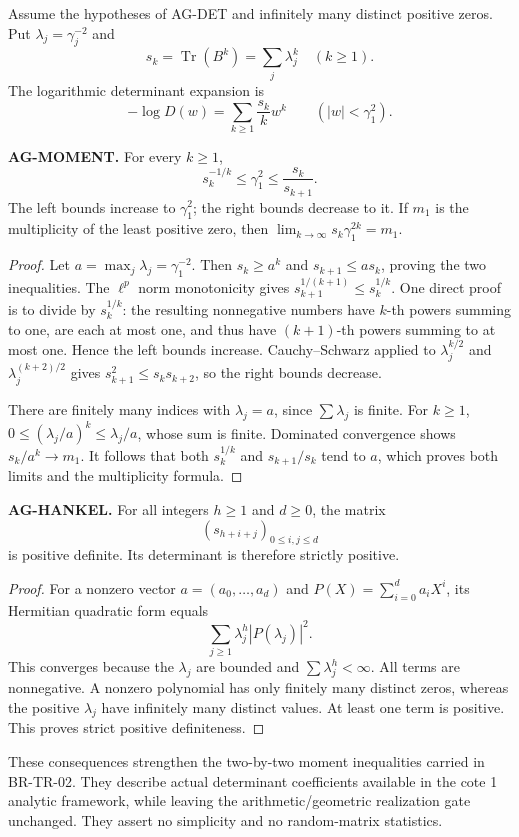 \documentclass[11pt,a4paper]{article}
\begin{document}
Assume the hypotheses of AG-DET and infinitely many distinct positive
zeros. Put $\lambda_j=\gamma_j^{-2}$ and
\[
 s_k=\operatorname{Tr}(B^k)=\sum_j\lambda_j^k\quad(k\ge1).
\]
The logarithmic determinant expansion is
\[
 -\log D(w)=\sum_{k\ge1}\frac{s_k}{k}w^k
 \qquad (|w|<\gamma_1^2).
\]

\textbf{AG-MOMENT.} For every $k\ge1$,
\[
 s_k^{-1/k}\le\gamma_1^2\le\frac{s_k}{s_{k+1}}.
\]
The left bounds increase to $\gamma_1^2$; the right bounds decrease to it.
If $m_1$ is the multiplicity of the least positive zero, then
$\lim_{k\to\infty}s_k\gamma_1^{2k}=m_1$.

\begin{proof}
Let $a=\max_j\lambda_j=\gamma_1^{-2}$. Then
$s_k\ge a^k$ and $s_{k+1}\le a s_k$, proving the two inequalities.
The $\ell^p$ norm monotonicity gives
$s_{k+1}^{1/(k+1)}\le s_k^{1/k}$. One direct proof is to divide by
$s_k^{1/k}$: the resulting nonnegative numbers have $k$-th powers
summing to one, are each at most one, and thus have $(k+1)$-th powers
summing to at most one. Hence the left bounds increase.
Cauchy--Schwarz applied to
$\lambda_j^{k/2}$ and $\lambda_j^{(k+2)/2}$ gives
$s_{k+1}^2\le s_ks_{k+2}$, so the right bounds decrease.

There are finitely many indices with $\lambda_j=a$, since $\sum\lambda_j$
is finite. For $k\ge1$,
$0\le(\lambda_j/a)^k\le\lambda_j/a$, whose sum is finite.
Dominated convergence shows
$s_k/a^k\to m_1$. It follows that both $s_k^{1/k}$ and
$s_{k+1}/s_k$ tend to $a$, which proves both limits and the
multiplicity formula.
\end{proof}

\textbf{AG-HANKEL.} For all integers $h\ge1$ and $d\ge0$, the matrix
\[
 (s_{h+i+j})_{0\le i,j\le d}
\]
is positive definite. Its determinant is therefore strictly positive.

\begin{proof}
For a nonzero vector $a=(a_0,\ldots,a_d)$ and
$P(X)=\sum_{i=0}^d a_iX^i$, its Hermitian quadratic form equals
\[
 \sum_{j\ge1}\lambda_j^h|P(\lambda_j)|^2.
\]
This converges because the $\lambda_j$ are bounded and
$\sum\lambda_j^h<\infty$. All terms are nonnegative. A nonzero
polynomial has only finitely many distinct zeros, whereas the positive
$\lambda_j$ have infinitely many distinct values. At least one term
is positive. This proves strict positive definiteness.
\end{proof}

These consequences strengthen the two-by-two moment inequalities carried
in BR-TR-02. They describe actual determinant coefficients available in
the cote 1 analytic framework, while leaving the arithmetic/geometric
realization gate unchanged. They assert no simplicity and no
random-matrix statistics.
\end{document}
